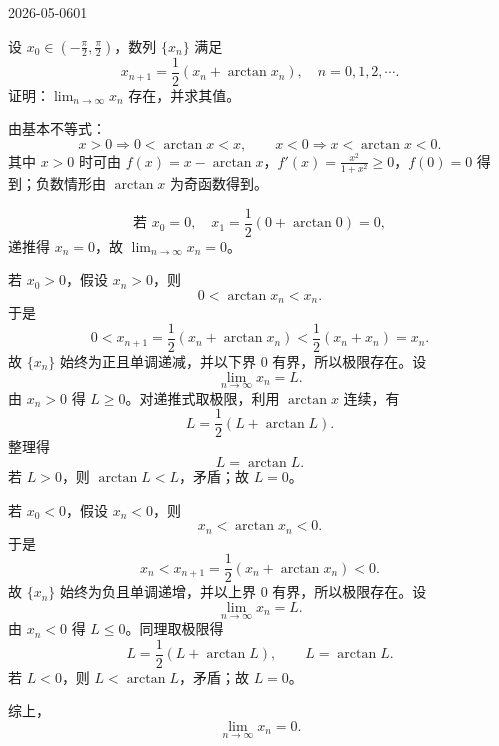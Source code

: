 \begin{mistake}{2026-05-06}{01}

\begin{problemcontent}
设 \(x_0\in\left(-\frac{\pi}{2},\frac{\pi}{2}\right)\)，数列 \(\{x_n\}\) 满足
\[
x_{n+1}=\frac12\left(x_n+\arctan x_n\right),\quad n=0,1,2,\cdots.
\]
证明：\(\lim_{n\to\infty}x_n\) 存在，并求其值。
\end{problemcontent}

\begin{solutioncontent}
由基本不等式：
\[
x>0\Rightarrow 0<\arctan x<x,\qquad x<0\Rightarrow x<\arctan x<0.
\]
其中 \(x>0\) 时可由 \(f(x)=x-\arctan x\)，\(f'(x)=\frac{x^2}{1+x^2}\ge0\)，\(f(0)=0\) 得到；负数情形由 \(\arctan x\) 为奇函数得到。

\[
\text{若 }x_0=0,\quad x_1=\frac12(0+\arctan0)=0,
\]
递推得 \(x_n=0\)，故 \(\lim_{n\to\infty}x_n=0\)。

若 \(x_0>0\)，假设 \(x_n>0\)，则
\[
0<\arctan x_n<x_n.
\]
于是
\[
0<x_{n+1}=\frac12(x_n+\arctan x_n)<\frac12(x_n+x_n)=x_n.
\]
故 \(\{x_n\}\) 始终为正且单调递减，并以下界 \(0\) 有界，所以极限存在。设
\[
\lim_{n\to\infty}x_n=L.
\]
由 \(x_n>0\) 得 \(L\ge0\)。对递推式取极限，利用 \(\arctan x\) 连续，有
\[
L=\frac12(L+\arctan L).
\]
整理得
\[
L=\arctan L.
\]
若 \(L>0\)，则 \(\arctan L<L\)，矛盾；故 \(L=0\)。

若 \(x_0<0\)，假设 \(x_n<0\)，则
\[
x_n<\arctan x_n<0.
\]
于是
\[
x_n< x_{n+1}=\frac12(x_n+\arctan x_n)<0.
\]
故 \(\{x_n\}\) 始终为负且单调递增，并以上界 \(0\) 有界，所以极限存在。设
\[
\lim_{n\to\infty}x_n=L.
\]
由 \(x_n<0\) 得 \(L\le0\)。同理取极限得
\[
L=\frac12(L+\arctan L),\qquad L=\arctan L.
\]
若 \(L<0\)，则 \(L<\arctan L\)，矛盾；故 \(L=0\)。

综上，
\[
\lim_{n\to\infty}x_n=0.
\]
\end{solutioncontent}


\end{mistake}
